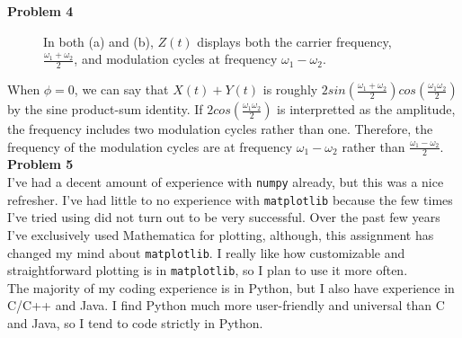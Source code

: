 \documentclass[12pt]{article}
\begin{document}
	\noindent\textbf{\large Problem 4}
	\begin{figure}[ht]
		\caption{In both (a) and (b), $Z(t)$ displays both the carrier frequency, $\frac{\omega_1 + \omega_2}{2}$, and modulation cycles at frequency $\omega_1 - \omega_2$.}\label{fig:4}
	\end{figure}
	
	When $\phi = 0$, we can say that $X(t) + Y(t)$ is roughly $2sin(\frac{\omega_1+\omega_2}{2})cos(\frac{\omega_1\omega_2}{2})$ by the sine product-sum identity. If $2cos(\frac{\omega_1\omega_2}{2})$ is interpretted as the amplitude, the frequency includes two modulation cycles rather than one. Therefore, the frequency of the modulation cycles are at frequency $\omega_1 - \omega_2$ rather than $\frac{\omega_1 - \omega_2}{2}$. \\[4mm]
		
	\noindent\textbf{\large Problem 5}\\[2mm]
	I've had a decent amount of experience with \verb|numpy| already, but this was a nice refresher. I've had little to no experience with \verb|matplotlib| because the few times I've tried using did not turn out to be very successful. Over the past few years I've exclusively used Mathematica for plotting, although, this assignment has changed my mind about \verb|matplotlib|. I really like how customizable and straightforward plotting is in \verb|matplotlib|, so I plan to use it more often.\\
	The majority of my coding experience is in Python, but I also have experience in C/C++ and Java. I find Python much more user-friendly and universal than C and Java, so I tend to code strictly in Python. 
		
\end{document}
